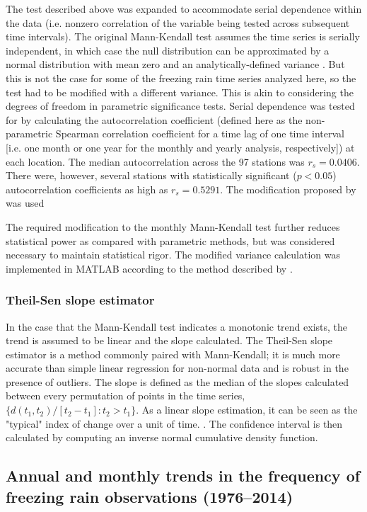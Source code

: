 \documentclass[twocol]{ametsoc}
\begin{document}
The test described above was expanded to accommodate serial dependence within the data (i.e. nonzero correlation of the variable being tested across subsequent time intervals). The original Mann-Kendall test assumes the time series is serially independent, in which case the null distribution can be approximated by a normal distribution with mean zero and an analytically-defined variance \citep{kendall1955rank}. But this is not the case for some of the freezing rain time series analyzed here, so the test had to be modified with a different variance. This is akin to considering the degrees of freedom in parametric significance tests. Serial dependence was tested for by calculating the autocorrelation coefficient (defined here as the non-parametric Spearman correlation coefficient for a time lag of one time interval [i.e. one month or one year for the monthly and yearly analysis, respectively]) at each location. The median autocorrelation across the 97 stations was $r_s = 0.0406$. There were, however, several stations with statistically significant ($p<0.05$) autocorrelation coefficients as high as $r_s = 0.5291$. The modification proposed by \citet{hamed1998modified} was used

The required modification to the monthly Mann-Kendall test further reduces statistical power as compared with parametric methods, but was considered necessary to maintain statistical rigor. The modified variance calculation was implemented in MATLAB according to the method described by \citet{hirsch1984nonparametric}.


\subsubsection{Theil-Sen slope estimator}
In the case that the Mann-Kendall test indicates a monotonic trend exists, the trend is assumed to be linear and the slope calculated. The Theil-Sen slope estimator is a method commonly paired with Mann-Kendall; it is much more accurate than simple linear regression for non-normal data and is robust in the presence of outliers. The slope is defined as the median of the slopes calculated between every permutation of points in the time series, $\{d(t_1,t_2)/[t_2-t_1]:t_2>t_1\}$. As a linear slope estimation, it can be seen as the "typical" index of change over a unit of time. \citep{chandler2011statistical}. The confidence interval is then calculated by computing an inverse normal cumulative density function.


\subsection{Annual and monthly trends in the frequency of freezing rain observations (1976--2014)}
\end{document}
